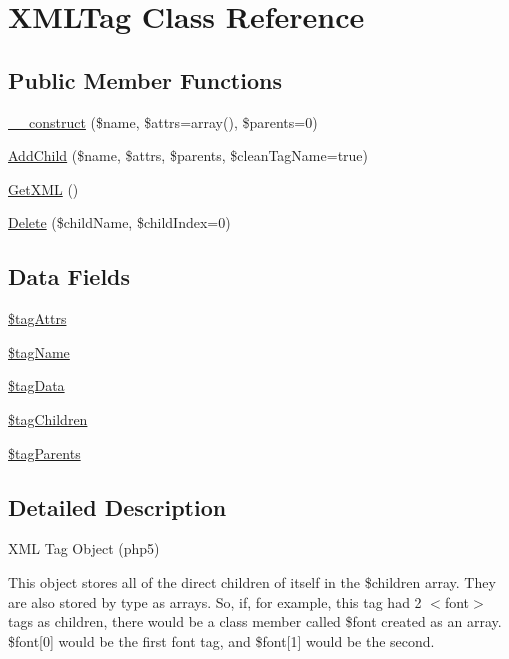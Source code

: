 \hypertarget{class_x_m_l_tag}{\section{\-X\-M\-L\-Tag \-Class \-Reference}
\label{class_x_m_l_tag}
}
\subsection*{\-Public \-Member \-Functions}
\begin{DoxyCompactItemize}
\item 
\hyperlink{class_x_m_l_tag_afca8aa983223fefe506534f2ef09f9cf}{\-\_\-\-\_\-construct} (\$name, \$attrs=array(), \$parents=0)
\item 
\hyperlink{class_x_m_l_tag_acd098790d83cebfe3eac3c2164ab57c4}{\-Add\-Child} (\$name, \$attrs, \$parents, \$clean\-Tag\-Name=true)
\item 
\hyperlink{class_x_m_l_tag_af5346af952d1e12d3b3dfda657e5c404}{\-Get\-X\-M\-L} ()
\item 
\hyperlink{class_x_m_l_tag_a019e25110d4cf766e5884cc630c99060}{\-Delete} (\$child\-Name, \$child\-Index=0)
\end{DoxyCompactItemize}
\subsection*{\-Data \-Fields}
\begin{DoxyCompactItemize}
\item 
\hyperlink{class_x_m_l_tag_a0bdcd2056ab299f9c7445ee392554801}{\$tag\-Attrs}
\item 
\hyperlink{class_x_m_l_tag_a526eef5c35551ca57b86d20034360d16}{\$tag\-Name}
\item 
\hyperlink{class_x_m_l_tag_a54d28f1823b6ebc04b6aac2b4a006047}{\$tag\-Data}
\item 
\hyperlink{class_x_m_l_tag_a2821a1ccb28feedeb1090436a5f83480}{\$tag\-Children}
\item 
\hyperlink{class_x_m_l_tag_a057b424591d6238416f982c4ab8f8386}{\$tag\-Parents}
\end{DoxyCompactItemize}


\subsection{\-Detailed \-Description}
\-X\-M\-L \-Tag \-Object (php5)

\-This object stores all of the direct children of itself in the \$children array. \-They are also stored by type as arrays. \-So, if, for example, this tag had 2 $<$font$>$ tags as children, there would be a class member called \$font created as an array. \$font\mbox{[}0\mbox{]} would be the first font tag, and \$font\mbox{[}1\mbox{]} would be the second.

